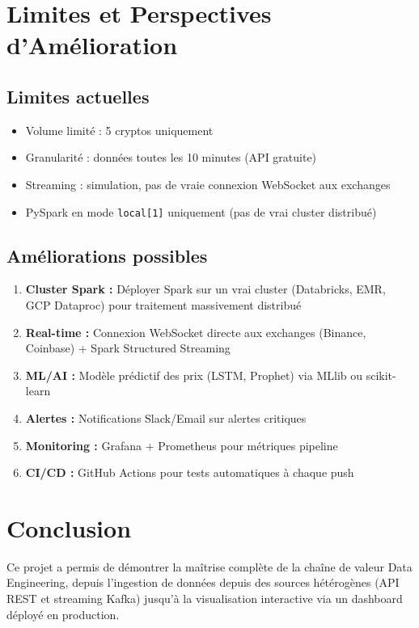 \documentclass[12pt,a4paper]{article}
\begin{document}
\section{Limites et Perspectives d'Amélioration}

\subsection{Limites actuelles}
\begin{itemize}
    \item Volume limité : 5 cryptos uniquement
    \item Granularité : données toutes les 10 minutes (API gratuite)
    \item Streaming : simulation, pas de vraie connexion WebSocket aux exchanges
    \item PySpark en mode \texttt{local[1]} uniquement (pas de vrai cluster distribué)
\end{itemize}

\subsection{Améliorations possibles}
\begin{enumerate}
    \item \textbf{Cluster Spark :} Déployer Spark sur un vrai cluster (Databricks, EMR, GCP Dataproc) pour traitement massivement distribué
    \item \textbf{Real-time :} Connexion WebSocket directe aux exchanges (Binance, Coinbase) + Spark Structured Streaming
    \item \textbf{ML/AI :} Modèle prédictif des prix (LSTM, Prophet) via MLlib ou scikit-learn
    \item \textbf{Alertes :} Notifications Slack/Email sur alertes critiques
    \item \textbf{Monitoring :} Grafana + Prometheus pour métriques pipeline
    \item \textbf{CI/CD :} GitHub Actions pour tests automatiques à chaque push
\end{enumerate}

\section{Conclusion}

Ce projet a permis de démontrer la maîtrise complète de la chaîne de valeur Data Engineering, depuis l'ingestion de données depuis des sources hétérogènes (API REST et streaming Kafka) jusqu'à la visualisation interactive via un dashboard déployé en production.
\end{document}
